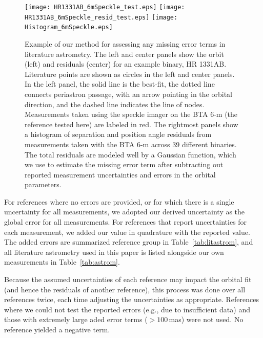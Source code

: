 \documentclass[twocolumn]{aastex62}
\begin{document}
\begin{figure}[ht]
\begin{center}
\texttt{[image: HR1331AB\_6mSpeckle\_test.eps]}
\texttt{[image: HR1331AB\_6mSpeckle\_resid\_test.eps]}
\texttt{[image: Histogram\_6mSpeckle.eps]}
\caption{Example of our method for assessing any missing error terms in literature astrometry. The left and center panels show the orbit (left) and residuals (center) for an example binary, HR 1331AB. Literature points are shown as circles in the left and center panels. In the left panel, the solid line is the best-fit, the dotted line connects periastron passage, with an arrow pointing in the orbital direction, and the dashed line indicates the line of nodes. Measurements taken using the speckle imager on the BTA 6-m (the reference tested here) are labeled in red. The rightmost panels show a histogram of separation and position angle residuals from measurements taken with the BTA 6-m across 39 different binaries. The total residuals are modeled well by a Gaussian function, which we use to estimate the missing error term after subtracting out reported measurement uncertainties and errors in the orbital parameters. }
\label{fig:literr}
\end{center}
\end{figure}

For references where no errors are provided, or for which there is a single uncertainty for all measurements, we adopted our derived uncertainty as the global error for all measurements. For references that report uncertainties for each measurement, we added our value in quadrature with the reported value. The added errors are summarized reference group in Table~\ref{tab:litastrom}, and all literature astrometry used in this paper is listed alongside our own measurements in Table~\ref{tab:astrom}. 

Because the assumed uncertainties of each reference may impact the orbital fit (and hence the residuals of another reference), this process was done over all references twice, each time adjusting the uncertainties as appropriate. References where we could not test the reported errors (e.g., due to insufficient data) and those with extremely large aded error terms ($>100$\,mas) were not used. No reference yielded a negative term. 
\end{document}
